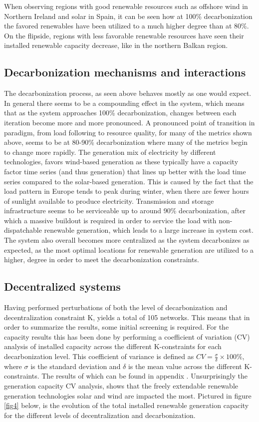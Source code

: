 \documentclass[preprint,12pt,nopreprintline]{elsarticle}
\begin{document}
\medskip
\noindent
When observing regions with good renewable resources such as offshore wind in Northern Ireland and solar in Spain, it can be seen how at 100\% decarbonization the favored renewables have been utilized to a much higher degree than at 80\%. On the flipside, regions with less favorable renewable resources have seen their installed renewable capacity decrease, like in the northern Balkan region.

\subsection{Decarbonization mechanisms and interactions}
\noindent
The decarbonization process, as seen above behaves mostly as one would expect. In general there seems to be a compounding effect in the system, which means that as the system approaches 100\% decarbonization, changes between each iteration become more and more pronounced. A pronounced point of transition in paradigm, from load following to resource quality, for many of the metrics shown above, seems to be at 80-90\% decarbonization where many of the metrics begin to change more rapidly. The generation mix of electricity by different technologies, favors wind-based generation as these typically have a capacity factor time series (and thus generation) that lines up better with the load time series compared to the solar-based generation. This is caused by the fact that the load pattern in Europe tends to peak during winter, when there are fewer hours of sunlight available to produce electricity. Transmission and storage infrastructure seems to be serviceable up to around 90\% decarbonization, after which a massive buildout is required in order to service the load with non-dispatchable renewable generation, which leads to a large increase in system cost. The system also overall becomes more centralized as the system decarbonizes as expected, as the most optimal locations for renewable generation are utilized to a higher, degree in order to meet the decarbonization constraints.

\subsection{Decentralized systems}
\noindent
Having performed perturbations of both the level of decarbonization and decentralization constraint K, yields a total of 105 networks. This means that in order to summarize the results, some initial screening is required. For the capacity results this has been done by performing a coefficient of variation (CV) analysis of installed capacity across the different K-constraints for each decarbonization level. This coefficient of variance is defined as $CV = \frac{\sigma}{\delta} \times 100\%$, where $\sigma$ is the standard deviation and $\delta$ is the mean value across the different K-constraints. The results of which can be found in appendix . Unsurprisingly the generation capacity CV analysis, shows that the freely extendable renewable generation technologies solar and wind are impacted the most. Pictured in figure \ref{fig4} below, is the evolution of the total installed renewable generation capacity for the different levels of decentralization and decarbonization. 
\end{document}
